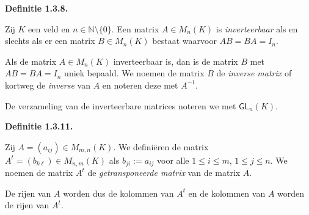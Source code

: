 \documentclass[10pt,a4paper]{article}
\newenvironment{res}[1]{%
  \par\noindent\textbf{Definitie #1.}~\ignorespaces
}{%
  \par\vspace{2pt}\normalfont
}
\begin{document}
\begin{res}{1.3.8}
\begin{myenum}
\item Zij $K$ een veld en $n\in\mathbb N\setminus\{0\}$. Een matrix $A\in M_n(K)$ is \textit{inverteerbaar} als en slechts als er een matrix $B\in M_n(K)$ bestaat waarvoor $AB=BA=I_n$.
\item Als de matrix $A\in M_n(K)$ inverteerbaar is, dan is de matrix $B$ met $AB=BA=I_n$ uniek bepaald. We noemen de matrix $B$ de \textit{inverse matrix} of kortweg de \textit{inverse} van $A$ en noteren deze met $A^{-1}$.
\item De verzameling van de inverteerbare matrices noteren we met $\mathsf{GL}_n(K)$.
\end{myenum}
\end{res}

\begin{res}{1.3.11}
Zij $A=(a_{ij})\in M_{m,n}(K)$. We defini\"eren de matrix $A^t=(b_{k\ell})\in M_{n,m}(K)$ als $b_{ji}:=a_{ij}$ voor alle $1\le i\le m$, $1\le j\le n$. We noemen de matrix $A^t$ de \textit{getransponeerde matrix} van de matrix $A$.

De rijen van $A$ worden dus de kolommen van $A^t$ en de kolommen van $A$ worden de rijen van $A^t$.
\end{res}
\end{document}
